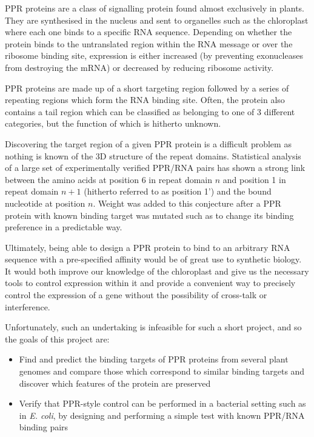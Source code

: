 \documentclass[twoside,a4paper]{article}
\begin{document}
\begin{multicols}{2}
PPR proteins are a class of signalling protein found almost exclusively in
plants\cite{Small2000}. 
They are synthesised in the nucleus and sent to organelles such as the 
chloroplast where each one binds to a specific RNA sequence.
Depending on whether the protein binds to the untranslated region within the
RNA message or over the ribosome binding site, expression is either increased 
(by preventing exonucleases from destroying the mRNA) or decreased by reducing 
ribosome activity\cite{Pfalz2009}.

PPR proteins are made up of a short targeting region followed by a series of
repeating regions which form the RNA binding site.
Often, the protein also contains a tail region which can be classified as
belonging to one of 3 different categories, 
but the function of which is hitherto unknown\cite{Lurin2004}.

Discovering the target region of a given PPR protein is a difficult problem as
nothing is known of the 3D structure of the repeat domains.
Statistical analysis of a large set of experimentally verified PPR/RNA pairs
has shown a strong link between the amino acids at position 6 in repeat domain
$n$ and position 1 in repeat domain $n+1$ (hitherto referred to as position 1')
and the bound nucleotide at position $n$\cite{Barkan2012}.
Weight was added to this conjecture after a PPR protein with known binding
target was mutated such as to change its binding preference in a predictable
way\cite{Barkan2012}.

Ultimately, being able to design a PPR protein to bind to an arbitrary RNA
sequence with a pre-specified affinity would be of great use to synthetic
biology.
It would both improve our knowledge of the chloroplast and give us the
necessary tools to control expression within it and provide a convenient way to
precisely control the expression of a gene without the possibility of 
cross-talk or interference.

Unfortunately, such an undertaking is infeasible for such a short project, and
so the goals of this project are:
\begin{itemize}
  \item Find and predict the binding targets of PPR proteins from several plant 
    genomes and compare those which correspond to
    similar binding targets and discover which features of the protein are
    preserved
  \item Verify that PPR-style control can be performed in a bacterial setting
    such as in \textit{E. coli}, by designing and performing a simple test 
    with known PPR/RNA binding pairs
\end{itemize}



\end{multicols}
\end{document}

